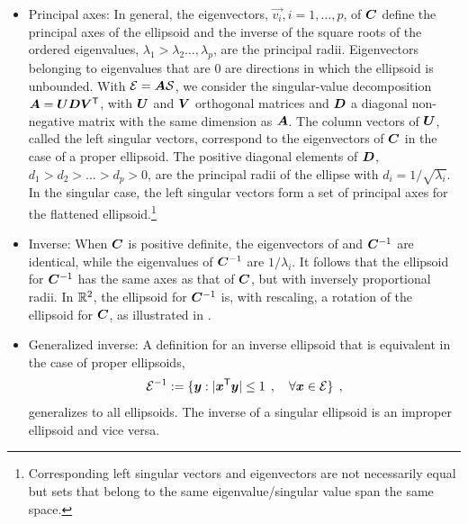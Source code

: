 \begin{itemize}
 \item Principal axes: In general, the eigenvectors, $\vec{v_i}, i=1,\dots,p$,
of $\bm{C}$ define the principal axes of the ellipsoid and
the inverse of the square roots of the ordered
eigenvalues, $\lambda_1 > \lambda_2 \dots, \lambda_p$, are the principal radii.
Eigenvectors belonging to eigenvalues that are 0 are directions in which the ellipsoid is unbounded.
With $\mathcal{E} = \bm{A} \mathcal{S}$, we consider the singular-value decomposition
$  \bm{A}= \bm{U} \bm{D} \bm{V} ^\mathsf{T}$,
with $\bm{U}$ and  $\bm{V}$ orthogonal matrices and  $\bm{D}$  a diagonal non-negative matrix
with the same dimension as $\bm{A}$.
The column vectors of $\bm{U}$, called the left singular vectors,
correspond to the eigenvectors of $\bm{C}$ in the case of a proper ellipsoid.
The positive diagonal elements of $\bm{D}$, $d_1 > d_2 > ... > d_p>0$,
are the principal radii of the ellipse with $d_i = 1/\sqrt{\lambda_i}$.
In the singular case, the left singular vectors form a set of principal axes for the flattened ellipsoid.\footnote{Corresponding left singular vectors and eigenvectors are not necessarily equal but sets that belong to the same eigenvalue/singular value span the same space.}

 \item Inverse: When $\bm{C}$ is positive definite, the eigenvectors of  and $\bm{C}^{-1}$ are identical, while
the
 eigenvalues of $\bm{C}^{-1}$ are $1/\lambda_i$. It follows that the ellipsoid for
 $\bm{C}^{-1}$ has the same axes as that of $\bm{C}$, but with inversely proportional radii.
 In $\mathbb{R}^{2}$, the ellipsoid for $\bm{C}^{-1}$
 is, with rescaling, a  rotation of the ellipsoid for $\bm{C}$,
 as illustrated in .

 \item Generalized inverse: A definition for an inverse ellipsoid that is equivalent in the case of proper ellipsoids,
\begin{equation}\label{eq:ellipseginv}
\mathcal{E}^{-1} := \{ \bm{y} :   |\bm{x} ^\mathsf{T} \bm{y}| \le 1 \:\: , \quad \forall \bm{x} \in \mathcal{E} \} \:\: ,
\end{equation}
generalizes to all ellipsoids. The inverse of a singular ellipsoid is an improper ellipsoid and vice versa.


\end{itemize}
